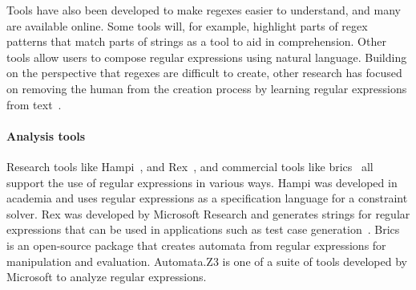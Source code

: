 Tools have also been developed to make regexes easier to understand, and many are available online.  Some tools will, for example, highlight parts of regex patterns that match parts of strings as a tool to aid in comprehension.  Other tools allow users to compose regular expressions using natural language.  Building on the perspective that regexes are difficult to create, other research has focused on removing the human from the creation process by learning regular expressions from  text~\cite{Babbar:2010:CBA:1871840.1871848, Li:2008:REL:1613715.1613719}.

\paragraph{Analysis tools} Research tools like Hampi~\cite{hampi}, and Rex~\cite{rex}, and commercial tools like brics~\cite{brics} all support the use of regular expressions in various ways. Hampi was developed  in academia and uses regular expressions as a specification language for a constraint solver. Rex was developed by Microsoft Research and generates strings for regular expressions that can be used in  applications such as test case generation~\cite{Anand:2013:OSM:2503903.2503991, Tillmann:2014:TAT:2642937.2642941}. Brics is an open-source package that creates automata from regular expressions for manipulation and evaluation. Automata.Z3 is one of a suite of tools developed by Microsoft to analyze regular expressions.
